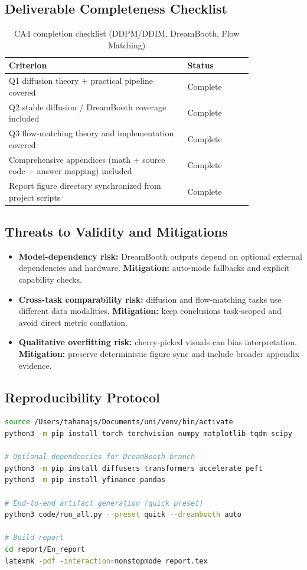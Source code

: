 \documentclass[a4paper,12pt]{article}
\begin{document}
\subsection{Deliverable Completeness Checklist}
\begin{table}[!t]
\centering
\caption{CA4 completion checklist (DDPM/DDIM, DreamBooth, Flow Matching)}
\begin{tabular}{|p{0.60\linewidth}|p{0.22\linewidth}|}
\hline
\textbf{Criterion} & \textbf{Status} \\
\hline
Q1 diffusion theory + practical pipeline covered & Complete \\
\hline
Q2 stable diffusion / DreamBooth coverage included & Complete \\
\hline
Q3 flow-matching theory and implementation covered & Complete \\
\hline
Comprehensive appendices (math + source code + answer mapping) included & Complete \\
\hline
Report figure directory synchronized from project scripts & Complete \\
\hline
\end{tabular}
\label{tab:ca4_completion_checklist}
\end{table}

\subsection{Threats to Validity and Mitigations}
\begin{itemize}
    \item \textbf{Model-dependency risk:} DreamBooth outputs depend on optional external dependencies and hardware. \textbf{Mitigation:} auto-mode fallbacks and explicit capability checks.
    \item \textbf{Cross-task comparability risk:} diffusion and flow-matching tasks use different data modalities. \textbf{Mitigation:} keep conclusions task-scoped and avoid direct metric conflation.
    \item \textbf{Qualitative overfitting risk:} cherry-picked visuals can bias interpretation. \textbf{Mitigation:} preserve deterministic figure sync and include broader appendix evidence.
\end{itemize}

\subsection{Reproducibility Protocol}
\begin{lstlisting}[language=bash]
source /Users/tahamajs/Documents/uni/venv/bin/activate
python3 -m pip install torch torchvision numpy matplotlib tqdm scipy

# Optional dependencies for DreamBooth branch
python3 -m pip install diffusers transformers accelerate peft
python3 -m pip install yfinance pandas

# End-to-end artifact generation (quick preset)
python3 code/run_all.py --preset quick --dreambooth auto

# Build report
cd report/En_report
latexmk -pdf -interaction=nonstopmode report.tex
\end{lstlisting}
\end{document}
